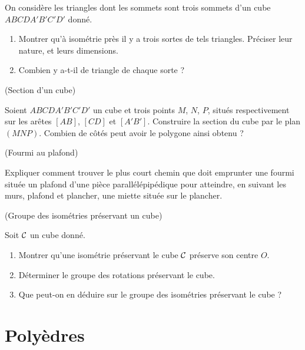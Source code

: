 \documentclass[a4paper,11pt,reqno]{amsart}
\begin{document}
\begin{exo}

  On considère les triangles dont les sommets sont trois sommets d'un cube $ABCDA'B'C'D'$ donné.
  \begin{enumerate}
    \item Montrer qu'à isométrie près il y a trois sortes de tels triangles. Préciser leur nature, et leurs dimensions.
    \item Combien y a-t-il de triangle de chaque sorte ?
  \end{enumerate}
\end{exo}

\begin{exo}[.7] (Section d'un cube)

  Soient $ABCDA'B'C'D'$ un cube et trois points $M$, $N$, $P$, situés respectivement sur les arêtes $[AB]$, $[CD]$ et $[A'B']$. Construire la section du cube par le plan $(MNP)$. Combien de côtés peut avoir le polygone ainsi obtenu ?
\end{exo}

\begin{exo}[.7] (Fourmi au plafond)

  Expliquer comment trouver le plus court chemin que doit emprunter une fourmi située un plafond d'une pièce parallélépipédique pour atteindre, en suivant les murs, plafond et plancher, une miette située sur le plancher.
\end{exo}


\begin{exo} (Groupe des isométries préservant un cube)

  Soit $\mathcal{C}$ un cube donné.
  \begin{enumerate}
    \item Montrer qu'une isométrie préservant le cube $\mathcal{C}$ préserve son centre $O$.
    \item Déterminer le groupe des rotations préservant le cube.
    \item Que peut-on en déduire sur le groupe des isométries préservant le cube ?
  \end{enumerate}
\end{exo}


\section{Polyèdres}
\end{document}
